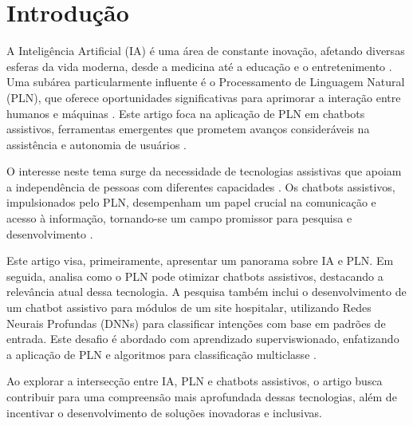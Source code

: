 \documentclass[conference]{IEEEtran}
\begin{document}


\section{Introdução}
A Inteligência Artificial (IA) é uma área de constante inovação, afetando diversas esferas da 
vida moderna, desde a medicina até a educação e o entretenimento \cite{Russell2016}. 
Uma subárea particularmente influente é o Processamento de Linguagem Natural (PLN), que 
oferece oportunidades significativas para aprimorar 
a interação entre humanos e máquinas \cite{Jurafsky2020}. 
Este artigo foca na aplicação de PLN em chatbots assistivos, ferramentas emergentes que 
prometem avanços consideráveis na assistência e autonomia de usuários \cite{McTear2016}.

O interesse neste tema surge da necessidade de tecnologias assistivas que apoiam a independência 
de pessoas com diferentes capacidades \cite{Goggin2003}. Os chatbots assistivos, 
impulsionados pelo PLN, desempenham um papel crucial na comunicação e acesso à informação, 
tornando-se um campo promissor para pesquisa e desenvolvimento \cite{Laranjo2018}.

Este artigo visa, primeiramente, apresentar um panorama sobre IA e PLN. 
Em seguida, analisa como o PLN pode otimizar chatbots assistivos, destacando a relevância 
atual dessa tecnologia. 
A pesquisa também inclui o desenvolvimento de um chatbot assistivo para módulos de um 
site hospitalar, utilizando Redes Neurais Profundas (DNNs) para classificar intenções 
com base em padrões de entrada. Este desafio é abordado com aprendizado superviswionado, 
enfatizando a aplicação de PLN e algoritmos para 
classificação multiclasse \cite{Goodfellow2016, Bengio2017}.

Ao explorar a intersecção entre IA, PLN e chatbots assistivos, 
o artigo busca contribuir para uma compreensão mais aprofundada dessas tecnologias, 
além de incentivar o desenvolvimento de soluções inovadoras e inclusivas.




\end{document}
